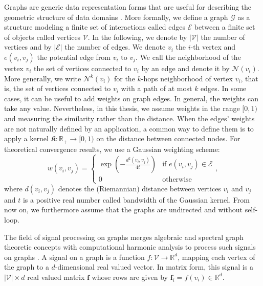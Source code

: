 \documentclass{article}
\begin{document}
Graphs are generic data representation forms that are useful for describing the geometric structure of data domains \citep{west1996introduction}. More formally, we define a graph $\mathcal{G}$ as a structure modeling a finite set of interactions called edges $\mathcal{E}$ between a finite set of objects called vertices $\mathcal{V}$. In the following, we denote by $|\mathcal{V}|$ the number of vertices and by $|\mathcal{E}|$ the number of edges. We denote $v_i$ the $i$-th vertex and $e(v_i, v_j)$ the potential edge from $v_i$ to $v_j$. We call the neighborhood of the vertex $v_i$ the set of vertices connected to $v_i$ by an edge and denote it by $\mathcal{N}(v_i)$. More generally, we write $\mathcal{N}^k(v_i)$ for the $k$-hops neighborhood of vertex $v_i$, that is, the set of vertices connected to $v_i$ with a path of at most $k$ edges. In some cases, it can be useful to add weights on graph edges. In general, the weights can take any value. Nevertheless, in this thesis, we assume weights in the range $[0, 1)$ and measuring the similarity rather than the distance. When the edges' weights are not naturally defined by an application, a common way to define them is to apply a kernel $\mathfrak{K} : \mathbb{R}_+ \to [0, 1)$ on the distance between connected nodes. For theoretical convergence results, we use a Gaussian weighting scheme: 
\begin{equation}
w(v_i, v_j) =
\left\{ 
\begin{array}{ll}
\exp \left(- \frac{d^2(v_i, v_j)}{4t}\right) & \text{if } e(v_i, v_j) \in \mathcal{E} \\
0 & \text{otherwise}
\end{array}
\right.,
\end{equation}
where $d(v_i, v_j)$ denotes the (Riemannian) distance between vertices $v_i$ and $v_j$ and $t$ is a positive real number called bandwidth of the Gaussian kernel. From now on, we furthermore assume that the graphs are undirected and without self-loop.

The field of signal processing on graphs merges algebraic and spectral graph theoretic concepts with computational harmonic analysis to process such signals on graphs \citep{shuman2013gsp}. A signal on a graph is a function $f : \mathcal{V} \to \mathbb{R}^d$, mapping each vertex of the graph to a $d$-dimensional real valued vector. In matrix form, this signal is a $|\mathcal{V}| \times d$ real valued matrix $\boldsymbol{f}$ whose rows are given by $\boldsymbol{f}_i = f(v_i) \in \mathbb{R}^d$. 
\end{document}
